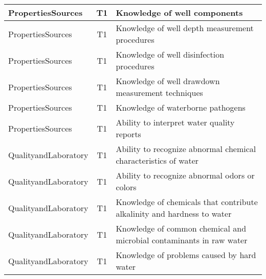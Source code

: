 \documentclass{article}
\begin{document}
\begin{table}[]
\begin{tabular}{|l|c|l|}
PropertiesSources                      & T1             & Knowledge of well   components                                                                                                    \\ \hline
PropertiesSources                      & T1             & Knowledge of well   depth measurement procedures                                                                                  \\ \hline
PropertiesSources                      & T1             & Knowledge of well   disinfection procedures                                                                                       \\ \hline
PropertiesSources                      & T1             & Knowledge of well   drawdown measurement techniques                                                                               \\ \hline
PropertiesSources                      & T1             & Knowledge of   waterborne pathogens                                                                                               \\ \hline
PropertiesSources                      & T1             & Ability to interpret   water quality reports                                                                                      \\ \hline
QualityandLaboratory                   & T1             & Ability to recognize   abnormal chemical characteristics of water                                                                 \\ \hline
QualityandLaboratory                   & T1             & Ability to recognize   abnormal odors or colors                                                                                   \\ \hline
QualityandLaboratory                   & T1             & Knowledge of   chemicals that contribute alkalinity and hardness to water                                                         \\ \hline
QualityandLaboratory                   & T1             & Knowledge of common   chemical and microbial contaminants in raw water                                                            \\ \hline
QualityandLaboratory                   & T1             & Knowledge of problems   caused by hard water                                                                                      \\ \hline

\end{tabular}
\end{table}
\end{document}
